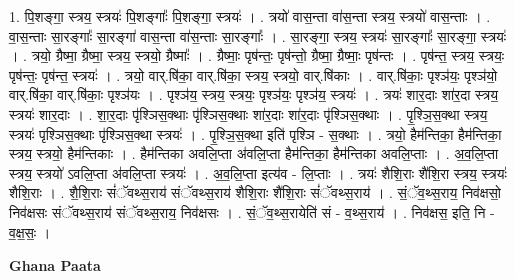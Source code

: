 \documentclass[17pt]{extarticle}
\begin{document}
1. पि॒शङ्गा॒ स्त्रय॒ स्त्रयः॑ पि॒शङ्गाः᳚ पि॒शङ्गा॒ स्त्रयः॑ । . त्रयो॑ वास॒न्ता वा॑स॒न्ता स्त्रय॒ स्त्रयो॑ वास॒न्ताः । . वा॒स॒न्ताः सा॒रङ्गाः᳚ सा॒रङ्गा॑ वास॒न्ता वा॑स॒न्ताः सा॒रङ्गाः᳚ । . सा॒रङ्गा॒ स्त्रय॒ स्त्रयः॑ सा॒रङ्गाः᳚ सा॒रङ्गा॒ स्त्रयः॑ । . त्रयो॒ ग्रैष्मा॒ ग्रैष्मा॒ स्त्रय॒ स्त्रयो॒ ग्रैष्माः᳚ । . ग्रैष्माः॒ पृष॑न्तः॒ पृष॑न्तो॒ ग्रैष्मा॒ ग्रैष्माः॒ पृष॑न्तः । . पृष॑न्त॒ स्त्रय॒ स्त्रयः॒ पृष॑न्तः॒ पृष॑न्त॒ स्त्रयः॑ । . त्रयो॒ वार्.षि॑का॒ वार्.षि॑का॒ स्त्रय॒ स्त्रयो॒ वार्.षि॑काः । . वार्.षि॑काः॒ पृश्ञ॑यः॒ पृश्ञ॑यो॒ वार्.षि॑का॒ वार्.षि॑काः॒ पृश्ञ॑यः । . पृश्ञ॑य॒ स्त्रय॒ स्त्रयः॒ पृश्ञ॑यः॒ पृश्ञ॑य॒ स्त्रयः॑ । . त्रयः॑ शार॒दाः शा॑र॒दा स्त्रय॒ स्त्रयः॑ शार॒दाः । . शा॒र॒दाः पृ॑श्ञिस॒क्थाः पृ॑श्ञिस॒क्थाः शा॑र॒दाः शा॑र॒दाः पृ॑श्ञिस॒क्थाः । . पृ॒श्ञि॒स॒क्था स्त्रय॒ स्त्रयः॑ पृश्ञिस॒क्थाः पृ॑श्ञिस॒क्था स्त्रयः॑ । . पृ॒श्ञि॒स॒क्था इति॑ पृश्ञि - स॒क्थाः । . त्रयो॒ हैम॑न्तिका॒ हैम॑न्तिका॒ स्त्रय॒ स्त्रयो॒ हैम॑न्तिकाः । . हैम॑न्तिका अवलि॒प्ता अ॑वलि॒प्ता हैम॑न्तिका॒ हैम॑न्तिका अवलि॒प्ताः । . अ॒व॒लि॒प्ता स्त्रय॒ स्त्रयो॑ ऽवलि॒प्ता अ॑वलि॒प्ता स्त्रयः॑ । . अ॒व॒लि॒प्ता इत्य॑व - लि॒प्ताः । . त्रयः॑ शैशि॒राः शै॑शि॒रा स्त्रय॒ स्त्रयः॑ शैशि॒राः । . शै॒शि॒राः सं॑ॅवथ्स॒राय॑ संॅवथ्स॒राय॑ शैशि॒राः शै॑शि॒राः सं॑ॅवथ्स॒राय॑ । . सं॒ॅव॒थ्स॒राय॒ निव॑क्षसो॒ निव॑क्षसः संॅवथ्स॒राय॑ संॅवथ्स॒राय॒ निव॑क्षसः । . सं॒ॅव॒थ्स॒रायेति॑ सं - व॒थ्स॒राय॑ । . निव॑क्षस॒ इति॒ नि - व॒क्ष॒सः॒ । \newline

\textbf{Ghana Paata } \newline
\end{document}
